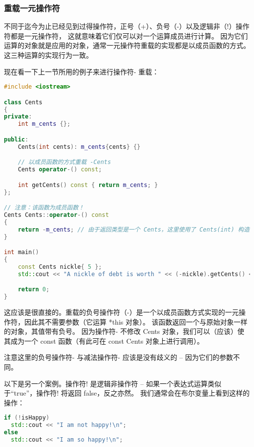 \documentclass[../../LearnCpp.tex]{subfiles}
\begin{document}

\subsubsection*{重载一元操作符}

不同于迄今为止已经见到过得操作符，正号（+）、负号（-）以及逻辑非（!）操作符都是一元操作符，
这就意味着它们仅可以对一个运算成员进行计算。
因为它们运算的对象就是应用的对象，通常一元操作符重载的实现都是以成员函数的方式。
这三种运算的实现行为一致。

现在看一下上一节所用的例子来进行操作符- 重载：

\begin{lstlisting}[language=C++]
#include <iostream>

class Cents
{
private:
    int m_cents {};

public:
    Cents(int cents): m_cents{cents} {}

    // 以成员函数的方式重载 -Cents
    Cents operator-() const;

    int getCents() const { return m_cents; }
};

// 注意：该函数为成员函数！
Cents Cents::operator-() const
{
    return -m_cents; // 由于返回类型是一个 Cents，这里使用了 Cents(int) 构造函数，进行了从 int 到 Cents 的一个隐式转换
}

int main()
{
    const Cents nickle{ 5 };
    std::cout << "A nickle of debt is worth " << (-nickle).getCents() << " cents\n";

    return 0;
}
\end{lstlisting}

这应该是很直接的。重载的负号操作符（-）是一个以成员函数方式实现的一元操作符，因此其不需要参数（它运算 *this 对象）。
该函数返回一个与原始对象一样的对象，其值带有负号。
因为操作符- 不修改 Cents 对象，我们可以（应该）使其成为一个 const 函数（有此可在 const Cents 对象上进行调用）。

注意这里的负号操作符- 与减法操作符- 应该是没有歧义的 -- 因为它们的参数不同。

以下是另一个案例。操作符! 是逻辑非操作符 -- 如果一个表达式运算类似于“true”，操作符! 将返回 false，反之亦然。
我们通常会在布尔变量上看到这样的操作：

\begin{lstlisting}[language=C++]
if (!isHappy)
  std::cout << "I am not happy!\n";
else
  std::cout << "I am so happy!\n";
\end{lstlisting}
\end{document}
